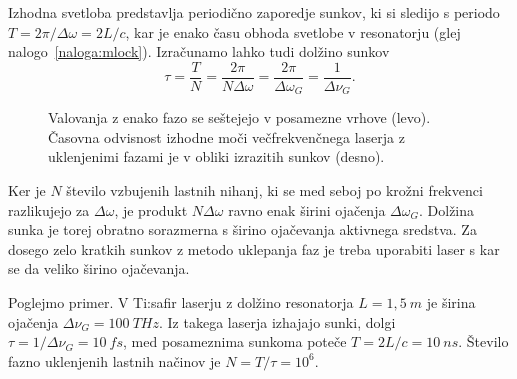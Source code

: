 Izhodna svetloba predstavlja periodično zaporedje sunkov, 
ki si sledijo s periodo $T=2\pi /\Delta \omega =2L/c$, kar je enako času obhoda
svetlobe v resonatorju (glej nalogo~\ref{naloga:mlock}).  Izračunamo lahko tudi 
dolžino sunkov
\begin{equation}
\tau=\frac{T}{N}=\frac{2\pi }{N\Delta \omega }=\frac{2\pi }{\Delta\omega_{G}} = 
\frac{1}{\Delta\nu_{G}}.
\label{5.37}
\end{equation}
\begin{figure}[h]
\centering
\def\svgwidth{140truemm} 

\caption{Valovanja z enako fazo se seštejejo v posamezne vrhove (levo). 
Časovna odvisnost izhodne moči večfrekvenčnega laserja z uklenjenimi fazami je 
v obliki izrazitih sunkov (desno).}
\label{s5.10}
\end{figure}

Ker je $N$ število vzbujenih lastnih nihanj, ki se med seboj po krožni 
frekvenci razlikujejo za $\Delta \omega$, je produkt $N\Delta \omega$ ravno enak
širini ojačenja $\Delta \omega_{G}$. Dolžina sunka je torej obratno sorazmerna s širino
ojačevanja aktivnega sredstva. Za dosego zelo kratkih sunkov z metodo uklepanja
faz je treba uporabiti laser s kar se da veliko širino ojačevanja. 

Poglejmo primer. V Ti:safir laserju z dolžino resonatorja $L=1,5~\si{m}$ je 
širina ojačenja $\Delta \nu_G = 100~\si{THz}$. Iz takega laserja izhajajo
sunki, dolgi $\tau = 1/\Delta \nu_G = 10~\si{fs}$, med posameznima sunkoma 
poteče $T = 2L/c = 10~\si{ns}$. Število fazno uklenjenih lastnih načinov je 
$N = T/\tau = 10^6$.

